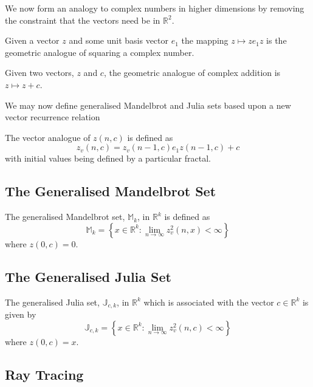 We now form an analogy to complex numbers in higher dimensions
by removing the constraint that the vectors need be in $\mathbb{R}^2$.

\begin{definition}
Given a vector $z$ and some unit basis vector $e_1$ the mapping
$z \mapsto ze_1z$ is the geometric analogue of squaring a complex number.
\end{definition}

\begin{definition}
Given two vectors, $z$ and $c$, the geometric analogue of complex addition
is $z \mapsto z + c$.
\end{definition}

We may now define generalised Mandelbrot and Julia sets based upon
a new vector recurrence relation
\begin{definition}
The vector analogue of $z(n,c)$ is defined as
\[
z_v(n,c) = z_v(n-1,c) e_1 z(n-1,c) + c
\]
with initial values being defined by a particular fractal.
\end{definition}

\subsection{The Generalised Mandelbrot Set}

\begin{definition}
The generalised Mandelbrot set, $\mathbb{M}_k$, in $\mathbb{R}^k$ 
    is defined as
\[
\mathbb{M}_k = 
\left\{x \in \mathbb{R}^k 
: \lim_{n \rightarrow \infty} z_v^2(n,x) < \infty \right\} 
\]
where $z(0,c) = 0$.
\end{definition}

\subsection{The Generalised Julia Set}

\begin{definition}
The generalised Julia set, $\mathbb{J}_{c,k}$, in $\mathbb{R}^k$
which is associated with the vector $c \in \mathbb{R}^k$ is given by
\[
\mathbb{J}_{c,k} = 
\left\{x \in \mathbb{R}^k
: \lim_{n \rightarrow \infty} z_v^2(n,c) < \infty \right\} 
\]
where $z(0,c) = x$.
\end{definition}

\subsection{Ray Tracing}

